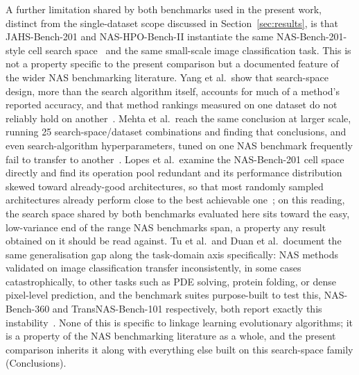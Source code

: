A further limitation shared by both benchmarks used in the present work, distinct from the single-dataset scope discussed in Section~\ref{sec:results}, is that JAHS-Bench-201 and NAS-HPO-Bench-II instantiate the same NAS-Bench-201-style cell search space~\citep{dong2020nasbench201} and the same small-scale image classification task. This is not a property specific to the present comparison but a documented feature of the wider NAS benchmarking literature. Yang et al.\ show that search-space design, more than the search algorithm itself, accounts for much of a method's reported accuracy, and that method rankings measured on one dataset do not reliably hold on another~\citep{yang2020nasfrustratinglyhard}. Mehta et al.\ reach the same conclusion at larger scale, running 25 search-space/dataset combinations and finding that conclusions, and even search-algorithm hyperparameters, tuned on one NAS benchmark frequently fail to transfer to another~\citep{mehta2022nasbenchsuite}. Lopes et al.\ examine the NAS-Bench-201 cell space directly and find its operation pool redundant and its performance distribution skewed toward already-good architectures, so that most randomly sampled architectures already perform close to the best achievable one~\citep{lopes2023nasbenchdesign}; on this reading, the search space shared by both benchmarks evaluated here sits toward the easy, low-variance end of the range NAS benchmarks span, a property any result obtained on it should be read against. Tu et al.\ and Duan et al.\ document the same generalisation gap along the task-domain axis specifically: NAS methods validated on image classification transfer inconsistently, in some cases catastrophically, to other tasks such as PDE solving, protein folding, or dense pixel-level prediction, and the benchmark suites purpose-built to test this, NAS-Bench-360 and TransNAS-Bench-101 respectively, both report exactly this instability~\citep{tu2022nasbench360,duan2021transnasbench101}. None of this is specific to linkage learning evolutionary algorithms; it is a property of the NAS benchmarking literature as a whole, and the present comparison inherits it along with everything else built on this search-space family (Conclusions).
